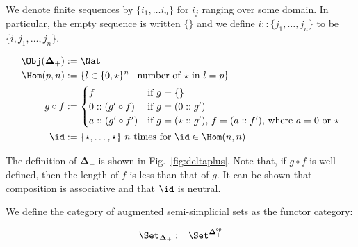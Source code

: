 \documentclass[10pt]{art.cls/art}
\newcommand{\DeltaPlus}{\ensuremath{\boldsymbol{\Delta}_+}}
\newcommand{\kstar}{{\star}}
\begin{document}
\begin{notation}
  We denote finite sequences by $\{i_1, \ldots i_n\}$ for $i_j$ ranging over some domain. In particular, the empty sequence is written $\{\}$ and we define $i :: \{j_1, \ldots, j_n\}$ to be $\{i, j_1, \ldots, j_n\}$.
\end{notation}

\begin{definition}[$\DeltaPlus$]
  \begin{figure*}[!t]
    \begin{align*}
      \Obj(\DeltaPlus) & := \Nat                                                                     \\
      \Hom(p, n)       & := \{l \in \{0, \kstar\}^n \mid \text{number of $\kstar$ in $l = p$}\}      \\
      g \circ f        & :=
      \begin{cases}
        f                  & \text{if $g = \{\}$}                                                      \\
        0 :: (g' \circ f)  & \text{if $g = (0 :: g')$}                                                 \\
        a :: (g' \circ f') & \text{if $g = (\star :: g')$, $f = (a :: f')$, where $a = 0$ or $\kstar$} \\
      \end{cases} \\
      \id              & := \{\kstar, \ldots, \kstar\} \text{ $n$ times for $\id \in \Hom(n, n)$}
    \end{align*}
    \caption{Definition of \DeltaPlus}\label{fig:deltaplus}
  \end{figure*}

  The definition of $\DeltaPlus$ is shown in Fig.~\ref{fig:deltaplus}. Note that, if $g \circ f$ is well-defined, then the length of $f$ is less than that of $g$. It can be shown that composition is associative and that $\id$ is neutral.
\end{definition}

\begin{definition}[$\Set_{\DeltaPlus}$]
  We define the category of augmented semi-simplicial sets as the functor category:

  \begin{equation*}
    \Set_{\DeltaPlus} := \Set^{\DeltaPlus^{\mathsf{op}}}
  \end{equation*}
\end{definition}
\end{document}
